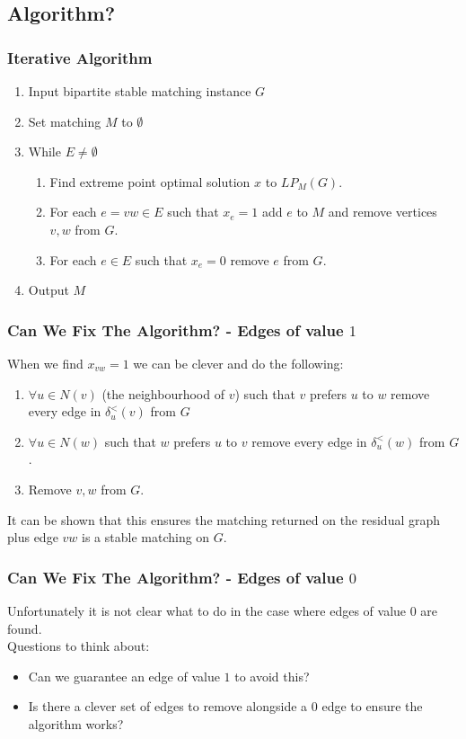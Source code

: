 \documentclass{beamer}
\begin{document}
\subsection{Algorithm?}
\begin{frame}
\frametitle{Iterative Algorithm}
\begin{enumerate}
\item Input bipartite stable matching instance $G$
\item Set matching $M$ to $\emptyset$
\item While $E \neq \emptyset$
\begin{enumerate}
\item Find extreme point optimal solution $x$ to $LP_M(G)$.
\item For each $e=vw \in E$ such that $x_e = 1$ add $e$ to $M$ and remove vertices $v,w$ from $G$.
\item For each $e \in E$ such that $x_e = 0$ remove $e$ from $G$.
\end{enumerate}
\item Output $M$
\end{enumerate}
\end{frame}
\begin{frame}
\frametitle{Can We Fix The Algorithm? - Edges of value $1$}
When we find $x_{vw} = 1$ we can be clever and do the following:
\begin{enumerate}
\item $\forall u \in N(v)$ (the neighbourhood of $v$) such that $v$ prefers $u$ to $w$ remove every edge in $\delta_u^<(v)$ from $G$
\item $\forall u \in N(w)$ such that $w$ prefers $u$ to $v$ remove every edge in $\delta_u^<(w)$ from $G$.
\item Remove $v, w$ from $G$.
\end{enumerate}
It can be shown that this ensures the matching returned on the residual graph plus edge $vw$ is a stable matching on $G$.\end{frame}
\begin{frame}
\frametitle{Can We Fix The Algorithm? - Edges of value $0$}
Unfortunately it is not clear what to do in the case where edges of value $0$ are found.\\
Questions to think about:
\begin{itemize}
\item Can we guarantee an edge of value $1$ to avoid this?
\item Is there a clever set of edges to remove alongside a $0$ edge to ensure the algorithm works?
\end{itemize}
\end{frame}
\end{document}
